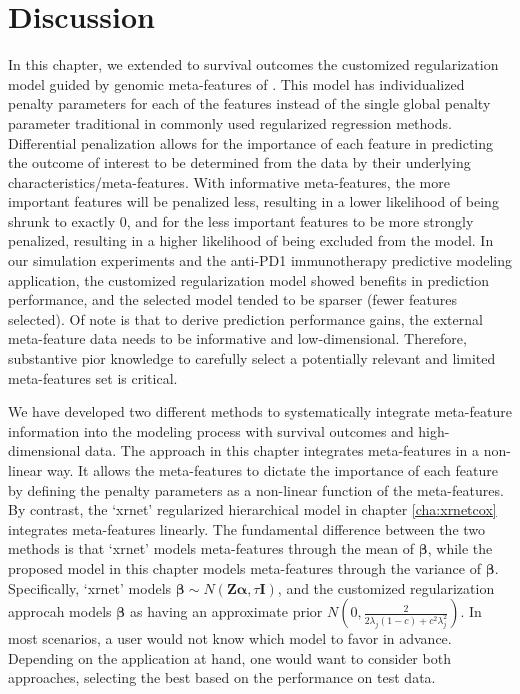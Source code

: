 \section{Discussion}
In this chapter, we extended to survival outcomes the customized regularization model guided by genomic meta-features of \cite{zeng2021incorporating}. This model has individualized penalty parameters for each of the features instead of the single global penalty parameter traditional in commonly used regularized regression methods. Differential penalization allows for the importance of each feature in predicting the outcome of interest to be determined from the data by their underlying characteristics/meta-features. With  informative meta-features, the more important features will be penalized less, resulting in a lower  likelihood of being shrunk to exactly 0, and for the less important features to be more strongly penalized, resulting in a higher likelihood of being excluded from the model. In our simulation experiments and the anti-PD1 immunotherapy predictive modeling application, the customized regularization model showed benefits in prediction performance, and the selected model tended to be sparser (fewer features selected). Of note is that to derive prediction performance gains, the external meta-feature data needs to be  informative and low-dimensional. Therefore,   substantive pior knowledge to carefully select a potentially relevant and limited meta-features set is critical. 

We have developed two different methods to systematically integrate meta-feature information into the modeling process with survival outcomes and high-dimensional data. The approach in this chapter integrates meta-features in a non-linear way. It allows the meta-features to dictate the importance of each feature by defining the penalty parameters as a non-linear function of the meta-features. By contrast, the `xrnet' regularized hierarchical model in chapter \ref{cha:xrnetcox} integrates meta-features linearly. The fundamental difference between the two methods is that `xrnet' models meta-features through the mean of $\bm{\beta}$, while the proposed model in this chapter models meta-features through the variance of $\bm{\beta}$. Specifically, `xrnet' models $\bm{\beta} \sim N(\bm{Z\alpha}, \tau\bm{I})$, and the customized regularization approcah models $\bm{\beta}$ as having an approximate prior $N(0, \frac{2}{2\lambda_j(1-c)+c^2\lambda_j^2})$. In most scenarios, a user would not know which model to favor in advance. Depending on the application at hand, one would want to consider both approaches, selecting the best based on the performance on test data. 


